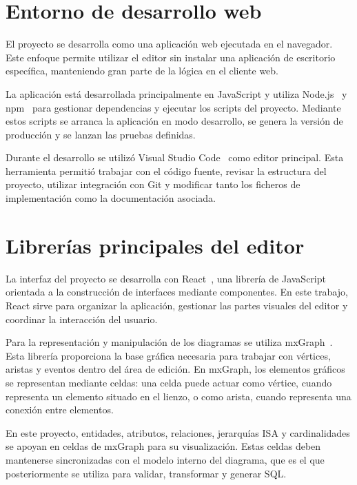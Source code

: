 
\section{Entorno de desarrollo web}

El proyecto se desarrolla como una aplicación web ejecutada en el navegador. Este enfoque permite utilizar el editor sin instalar una aplicación de escritorio específica, manteniendo gran parte de la lógica en el cliente web.

La aplicación está desarrollada principalmente en JavaScript y utiliza Node.js~\cite{nodejs} y npm~\cite{npm} para gestionar dependencias y ejecutar los scripts del proyecto. Mediante estos scripts se arranca la aplicación en modo desarrollo, se genera la versión de producción y se lanzan las pruebas definidas.

Durante el desarrollo se utilizó Visual Studio Code~\cite{vscode} como editor principal. Esta herramienta permitió trabajar con el código fuente, revisar la estructura del proyecto, utilizar integración con Git y modificar tanto los ficheros de implementación como la documentación asociada.

\section{Librerías principales del editor}

La interfaz del proyecto se desarrolla con React~\cite{react}, una librería de JavaScript orientada a la construcción de interfaces mediante componentes. En este trabajo, React sirve para organizar la aplicación, gestionar las partes visuales del editor y coordinar la interacción del usuario.

Para la representación y manipulación de los diagramas se utiliza mxGraph~\cite{mxgraph}. Esta librería proporciona la base gráfica necesaria para trabajar con vértices, aristas y eventos dentro del área de edición. En mxGraph, los elementos gráficos se representan mediante celdas: una celda puede actuar como vértice, cuando representa un elemento situado en el lienzo, o como arista, cuando representa una conexión entre elementos.

En este proyecto, entidades, atributos, relaciones, jerarquías ISA y cardinalidades se apoyan en celdas de mxGraph para su visualización. Estas celdas deben mantenerse sincronizadas con el modelo interno del diagrama, que es el que posteriormente se utiliza para validar, transformar y generar SQL.

